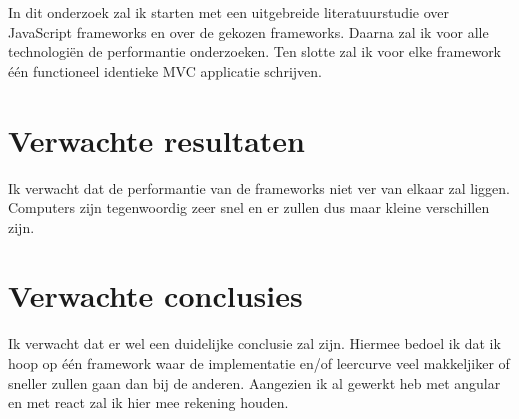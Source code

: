\documentclass[fleqn,10pt]{voorstel}
\begin{document}
In dit onderzoek zal ik starten met een uitgebreide literatuurstudie over JavaScript frameworks en over de gekozen frameworks. Daarna zal ik voor alle technologiën de performantie onderzoeken. Ten slotte zal ik voor elke framework één functioneel identieke MVC applicatie schrijven.

\section{Verwachte resultaten}
\label{sec:verwachte_resultaten}

Ik verwacht dat de performantie van de frameworks niet ver van elkaar zal liggen. Computers zijn tegenwoordig zeer snel en er zullen dus maar kleine verschillen zijn.

\section{Verwachte conclusies}
\label{sec:verwachte_conclusies}

Ik verwacht dat er wel een duidelijke conclusie zal zijn. Hiermee bedoel ik dat ik hoop op één framework waar de implementatie en/of leercurve veel makkeljiker of sneller zullen gaan dan bij de anderen. Aangezien ik al gewerkt heb met angular en met react zal ik hier mee rekening houden.


\printbibliography[heading=bibintoc]
\end{document}
